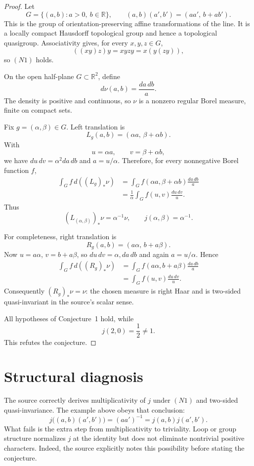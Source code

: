 \documentclass[11pt]{article}
\newcommand{\R}{\mathbb R}
\begin{document}
\begin{proof}
Let
\[
 G=\{(a,b):a>0,\ b\in\R\},
 \qquad
 (a,b)(a',b')=(aa',\,b+ab').
\]
This is the group of orientation-preserving affine transformations of the
line.  It is a locally compact Hausdorff topological group and hence a
topological quasigroup.  Associativity gives, for every $x,y,z\in G$,
\[
 ((xy)z)y=xyzy=x(y(zy)),
\]
so $(N1)$ holds.

On the open half-plane $G\subset\R^2$, define
\[
 d\nu(a,b)=\frac{da\,db}{a}.
\]
The density is positive and continuous, so $\nu$ is a nonzero regular Borel
measure, finite on compact sets.

Fix $g=(\alpha,\beta)\in G$.  Left translation is
\[
 L_g(a,b)=(\alpha a,\,\beta+\alpha b).
\]
With
\[
 u=\alpha a,\qquad v=\beta+\alpha b,
\]
we have $du\,dv=\alpha^2da\,db$ and $a=u/\alpha$.  Therefore, for every
nonnegative Borel function $f$,
\begin{align*}
 \int_G f\,d((L_g)_*\nu)
 &=\int_G f(\alpha a,\beta+\alpha b)\frac{da\,db}{a}\\
 &=\frac1\alpha\int_G f(u,v)\frac{du\,dv}{u}.
\end{align*}
Thus
\[
 (L_{(\alpha,\beta)})_*\nu=\alpha^{-1}\nu,
 \qquad j(\alpha,\beta)=\alpha^{-1}.
\]

For completeness, right translation is
\[
 R_g(a,b)=(a\alpha,\,b+a\beta).
\]
Now $u=a\alpha$, $v=b+a\beta$, so $du\,dv=\alpha,da\,db$ and again
$a=u/\alpha$.  Hence
\begin{align*}
 \int_G f\,d((R_g)_*\nu)
 &=\int_G f(a\alpha,b+a\beta)\frac{da\,db}{a}\\
 &=\int_G f(u,v)\frac{du\,dv}{u}.
\end{align*}
Consequently $(R_g)_*\nu=\nu$: the chosen measure is right Haar and is
two-sided quasi-invariant in the source's scalar sense.

All hypotheses of Conjecture~1 hold, while
\[
 j(2,0)=\frac12\ne1.
\]
This refutes the conjecture.
\end{proof}

\section{Structural diagnosis}

The source correctly derives multiplicativity of $j$ under $(N1)$ and
two-sided quasi-invariance.  The example above obeys that conclusion:
\[
 j\bigl((a,b)(a',b')\bigr)=(aa')^{-1}
 =j(a,b)j(a',b').
\]
What fails is the extra step from multiplicativity to triviality.  Loop or
group structure normalizes $j$ at the identity but does not eliminate
nontrivial positive characters.  Indeed, the source explicitly notes this
possibility before stating the conjecture.
\end{document}
